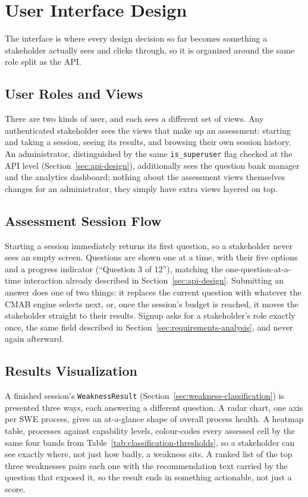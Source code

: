 \documentclass[a4paper, 12pt, oneside, openany, BCOR1cm,toc=chapterentrywithdots]{scrbook}
\begin{document}
\section{User Interface Design}
\label{sec:user-interface-design}

The interface is where every design decision so far becomes something a stakeholder actually
sees and clicks through, so it is organized around the same role split as the API.

\subsection{User Roles and Views}

There are two kinds of user, and each sees a different set of views. Any authenticated
stakeholder sees the views that make up an assessment: starting and taking a session, seeing its
results, and browsing their own session history. An administrator, distinguished by the same
\texttt{is\_superuser} flag checked at the API level (Section~\ref{sec:api-design}), additionally
sees the question bank manager and the analytics dashboard; nothing about the assessment views
themselves changes for an administrator, they simply have extra views layered on top.

\subsection{Assessment Session Flow}

Starting a session immediately returns its first question, so a stakeholder never sees an empty
screen. Questions are shown one at a time, with their five options and a progress indicator
(``Question 3 of 12''), matching the one-question-at-a-time interaction already described in
Section~\ref{sec:api-design}. Submitting an answer does one of two things: it replaces the
current question with whatever the CMAB engine selects next, or, once the session's budget is
reached, it moves the stakeholder straight to their results. Signup asks for a stakeholder's role
exactly once, the same field described in Section~\ref{sec:requirements-analysis}, and never
again afterward.

\subsection{Results Visualization}

A finished session's \texttt{WeaknessResult} (Section~\ref{sec:weakness-classification}) is
presented three ways, each answering a different question. A radar chart, one axis per SWE
process, gives an at-a-glance shape of overall process health. A heatmap table, processes against
capability levels, colour-codes every assessed cell by the same four bands from
Table~\ref{tab:classification-thresholds}, so a stakeholder can see exactly where, not just how
badly, a weakness sits. A ranked list of the top three weaknesses pairs each one with the
recommendation text carried by the question that exposed it, so the result ends in something
actionable, not just a score.
\end{document}

